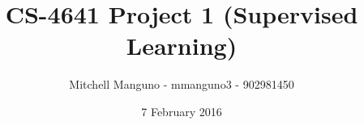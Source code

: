 

\title{CS-4641 Project 1 (Supervised Learning)}
\author{Mitchell Manguno - mmanguno3 - 902981450}
\date{7 February 2016}



\maketitle















